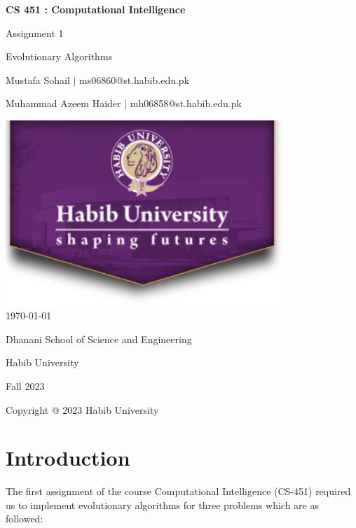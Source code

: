 \documentclass[12pt]{article}
\begin{document}
\begin{titlepage}
    \centering
    {\LARGE\textbf{CS 451 : Computational Intelligence}\par}
    \vspace{0.5cm}
    {\Large Assignment 1\par}
    \vspace{0.2cm}
    {\Large Evolutionary Algorithms\par}
    \vspace*{\fill} %
    {\large Mustafa Sohail $\mid$ ms06860@st.habib.edu.pk\par}
    {\large Muhammad Azeem Haider $\mid$ mh06858@st.habib.edu.pk\par}
    \vspace{2cm}
    \includegraphics[height=7cm]{images/HU_logo}\\\bigskip
    {\large \today}\\\bigskip\bigskip
    \vspace{1cm}
    \vspace{2cm}
    {\large Dhanani School of Science and Engineering\par}
    {\large Habib University\par}
    {\large Fall 2023\par}
    \vspace*{\fill} %
    {\large Copyright @ 2023 Habib University\par}
\end{titlepage}

\thispagestyle{empty} %
\tableofcontents
\clearpage

\section{Introduction}
The first assignment of the course Computational Intelligence (CS-451) required us to implement evolutionary algorithms for three problems which are as followed:
\end{document}
